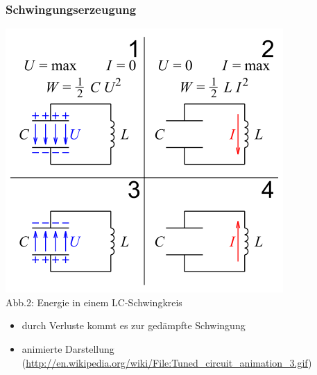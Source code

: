 \begin{frame}
\frametitle{Schwingungserzeugung}
\begin{center}
	\includegraphics[scale=0.35]{a04/Schwingkreis.png}\\
	{\tiny Abb.2: Energie in einem LC-Schwingkreis \cite{wmde}} \\
	\vspace{3mm}
	\begin{itemize}
		\item durch Verluste kommt es zur gedämpfte Schwingung\\
		\item animierte Darstellung (\url{http://en.wikipedia.org/wiki/File:Tuned_circuit_animation_3.gif})
	\end{itemize}
\end{center}
\end{frame}

